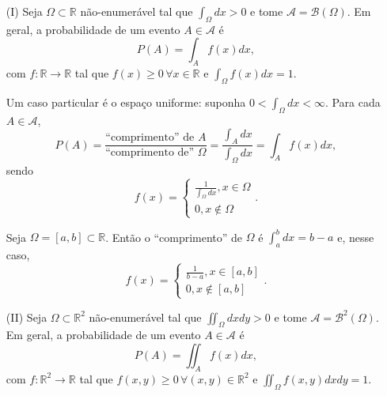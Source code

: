 \documentclass[../Notas.tex]{subfiles}
\begin{document}
\begin{itemize}
    \item[(I)] Seja $\Omega\subset\mathbb{R}$ não-enumerável tal que $\displaystyle{\int_{\Omega}dx > 0}$ e tome $\mathcal{A} = \mathcal{B}(\Omega)$. Em geral, a probabilidade de um evento $A\in\mathcal{A}$ é
    $$
    P(A) = \int_A f(x)dx,
    $$
    com $f:\mathbb{R}\to\mathbb{R}$ tal que $f(x)\geq 0 \, \forall x\in\mathbb{R}$ e $\displaystyle{ \int_{\Omega}f(x)dx  = 1}$.
    
    Um caso particular é o espaço uniforme: suponha $\displaystyle{ 0 < \int_{\Omega} dx < \infty }$. Para cada $A\in\mathcal{A}$, 
    $$
    P(A) = \frac{ \text{``comprimento'' de $A$} }{ \text{``comprimento de'' $\Omega$} } = \frac{ \int_{A}dx }{ \int_{\Omega}dx } = \int_A f(x) dx,
    $$
    sendo
    $$
    f(x) = \begin{cases}
    \displaystyle{ \frac{1}{\int_{\Omega}dx }, x\in\Omega } \\
    0, x\notin\Omega
    \end{cases}.
    $$
    \begin{example}
    Seja $\Omega = [a,b]\subset\mathbb{R}$. Então o ``comprimento'' de $\Omega$ é $\displaystyle{ \int_{a}^b dx } = b-a$ e, nesse caso,
    $$
    f(x) = \begin{cases}
    \displaystyle{ \frac{1}{b-a}, x\in [a,b] } \\
    0, x\notin [a,b]
    \end{cases}.
    $$
    \end{example}
    
    \item[(II)] Seja $\Omega\subset\mathbb{R}^2$ não-enumerável tal que $\displaystyle{\iint_{\Omega}dxdy > 0}$ e tome $\mathcal{A} = \mathcal{B}^2(\Omega)$. Em geral, a probabilidade de um evento $A\in\mathcal{A}$ é
    $$
    P(A) = \iint_A f(x)dx,
    $$
    com $f:\mathbb{R}^2\to\mathbb{R}$ tal que $f(x,y)\geq 0 \, \forall (x,y)\in\mathbb{R}^2$ e $\displaystyle{ \iint_{\Omega}f(x,y)dxdy  = 1}$.
    

\end{itemize}
\end{document}
